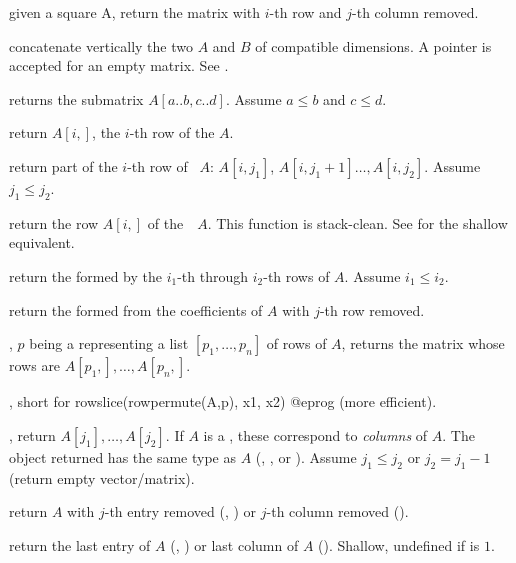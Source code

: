  given a square  A,
return the matrix with $i$-th row and $j$-th column removed.

 concatenate vertically the two  $A$
and $B$ of compatible dimensions. A  pointer is accepted for an
empty matrix. See .

returns the submatrix $A[a..b,c..d]$. Assume $a \leq b$ and  $c \leq d$.

 return $A[i,]$, the $i$-th row of the 
$A$.

 return part of the $i$-th
row of ~$A$: $A[i,j_1]$, $A[i,j_1+1]\dots,A[i,j_2]$. Assume $j_1
\leq j_2$.

 return the row $A[i,]$ of
the~~$A$. This function is stack-clean. See  for the
shallow equivalent.

 return the 
formed by the $i_1$-th through $i_2$-th rows of  $A$. Assume $i_1
\leq i_2$.

 return the  formed from the
coefficients of  $A$ with $j$-th row removed.

, $p$ being a 
representing a list $[p_1,\dots,p_n]$ of rows of  $A$, returns the
matrix whose rows are $A[p_1,],\dots, A[p_n,]$.

, short for
\bprog
  rowslice(rowpermute(A,p), x1, x2)
@eprog\noindent
(more efficient).

, return $A[j_1], \dots,
A[j_2]$. If $A$ is a , these correspond to \emph{columns} of $A$.
The object returned has the same type as $A$ (, ,
 or ). Assume $j_1 \leq j_2$ or $j_2 = j_1 - 1$ (return
empty vector/matrix).

 return $A$ with $j$-th entry removed
(, ) or $j$-th column removed ().

 return the last entry of $A$
(, ) or last column of $A$ (). Shallow, undefined
if  is $1$.

